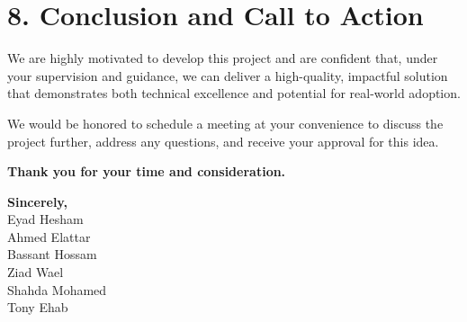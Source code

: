 \documentclass[12pt,a4paper]{article}
\begin{document}
\section*{8. Conclusion and Call to Action}
We are highly motivated to develop this project and are confident that, under your supervision and guidance, we can deliver a high-quality, impactful solution that demonstrates both technical excellence and potential for real-world adoption.  

We would be honored to schedule a meeting at your convenience to discuss the project further, address any questions, and receive your approval for this idea.  

\bigskip
\noindent
\textbf{Thank you for your time and consideration.}

\bigskip
\noindent
\textbf{Sincerely,} \\
Eyad Hesham \\
Ahmed Elattar \\
Bassant Hossam \\
Ziad Wael \\
Shahda Mohamed \\
Tony Ehab \\
\end{document}
